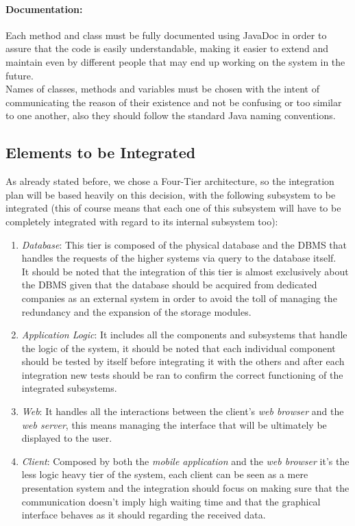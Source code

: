 \paragraph*{Documentation:\\} Each method and class must be fully documented using JavaDoc in order to assure that the code is easily understandable, making it easier to extend and maintain even by different people that may end up working on the system in the future.\\
Names of classes, methods and variables must be chosen with the intent of communicating the reason of their existence and not be confusing or too similar to one another, also they should follow the standard Java naming conventions.
\clearpage
\subsection{Elements to be Integrated}
As already stated before, we chose a Four-Tier architecture, so the integration plan will be based heavily on this decision, with the following subsystem to be integrated (this of course means that each one of this subsystem will have to be completely integrated with regard to its internal subsystem too):
\begin{enumerate}[label=\textbf{Tier \arabic*}]
\item \emph{Database}: This tier is composed of the physical database and the DBMS that handles the requests of the higher systems via query to the database itself.\\
It should be noted that the integration of this tier is almost exclusively about the DBMS given that the database should be acquired from dedicated companies as an external system in order to avoid the toll of managing the redundancy and the expansion of the storage modules.
\item \emph{Application Logic}: It includes all the components and subsystems that handle the logic of the system, it should be noted that each individual component should be tested by itself before integrating it with the others and after each integration new tests should be ran to confirm the correct functioning of the integrated subsystems.
\item \emph{Web}: It handles all the interactions between the client's \emph{web browser} and the \emph{web server}, this means managing the interface that will be ultimately be displayed to the user.
\item \emph{Client}: Composed by both the \emph{mobile application} and the \emph{web browser} it's the less logic heavy tier of the system, each client can be seen as a mere presentation system and the integration should focus on making sure that the communication doesn't imply high waiting time and that the graphical interface behaves as it should regarding the received data.
\end{enumerate}
